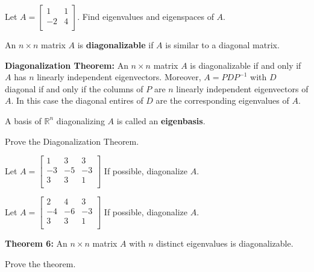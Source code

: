 \documentclass[12pt,letterpaper]{article}
\begin{document}
\begin{enumerate}

\Problem Let $A=\begin{bmatrix} 1 & 1\\ -2 & 4\\ \end{bmatrix}$. Find eigenvalues and eigenspaces of $A$.

\vfill

\begin{defn}
An $n\times n$ matrix $A$ is {\bf diagonalizable} if $A$ is similar to a diagonal matrix.
\end{defn}

\newpage

{\bf Diagonalization Theorem:} An $n \times n$ matrix $A$ is diagonalizable if and only if $A$ has $n$ linearly independent eigenvectors. Moreover, $A=PDP^{-1}$ with $D$ diagonal if and only if the columns of $P$ are $n$ linearly independent eigenvectors of $A$. In this case the diagonal entires of $D$ are the corresponding eigenvalues of $A$.

\begin{defn} A basis of $\mathbb{R}^n$ diagonalizing $A$ is called an {\bf eigenbasis}. 
\end{defn}

\Problem Prove the Diagonalization Theorem.

\vfill

\Problem Let $A=\begin{bmatrix} 
1 & 3 & 3\\
-3 & -5 & -3\\
3 & 3 & 1\\
\end{bmatrix}$ If possible, diagonalize $A$.

\vfill

\newpage

\Problem Let $A=\begin{bmatrix} 
2 & 4 & 3\\
-4 & -6 & -3\\
3 & 3 & 1\\
\end{bmatrix}$ If possible, diagonalize $A$.


\vfill
\vfill

{\bf Theorem 6:} An $n \times n$ matrix $A$ with $n$ distinct eigenvalues is diagonalizable.

\Problem Prove the theorem.

\vfill

\newpage


\end{enumerate}
\end{document}
